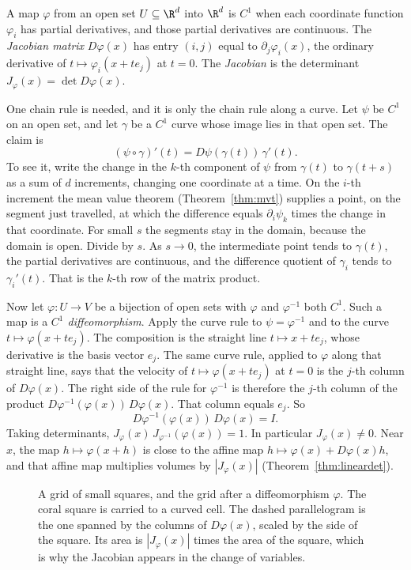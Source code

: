 A map $\varphi$ from an open set $U\subseteq\R^d$ into $\R^d$ is \emph{$C^1$} when each coordinate function $\varphi_i$ has partial derivatives, and those partial derivatives are continuous. The \emph{Jacobian matrix} $D\varphi(x)$ has entry $(i,j)$ equal to $\partial_j\varphi_i(x)$, the ordinary derivative of $t\mapsto\varphi_i(x+te_j)$ at $t=0$. The \emph{Jacobian} is the determinant $J_\varphi(x)=\det D\varphi(x)$.

One chain rule is needed, and it is only the chain rule along a curve. Let $\psi$ be $C^1$ on an open set, and let $\gamma$ be a $C^1$ curve whose image lies in that open set. The claim is
\[
(\psi\circ\gamma)'(t)=D\psi(\gamma(t))\,\gamma'(t).
\]
To see it, write the change in the $k$-th component of $\psi$ from $\gamma(t)$ to $\gamma(t+s)$ as a sum of $d$ increments, changing one coordinate at a time. On the $i$-th increment the mean value theorem (Theorem~\ref{thm:mvt}) supplies a point, on the segment just travelled, at which the difference equals $\partial_i\psi_k$ times the change in that coordinate. For small $s$ the segments stay in the domain, because the domain is open. Divide by $s$. As $s\to 0$, the intermediate point tends to $\gamma(t)$, the partial derivatives are continuous, and the difference quotient of $\gamma_i$ tends to $\gamma_i'(t)$. That is the $k$-th row of the matrix product.

Now let $\varphi:U\to V$ be a bijection of open sets with $\varphi$ and $\varphi^{-1}$ both $C^1$. Such a map is a \emph{$C^1$ diffeomorphism}. Apply the curve rule to $\psi=\varphi^{-1}$ and to the curve $t\mapsto\varphi(x+te_j)$. The composition is the straight line $t\mapsto x+te_j$, whose derivative is the basis vector $e_j$. The same curve rule, applied to $\varphi$ along that straight line, says that the velocity of $t\mapsto\varphi(x+te_j)$ at $t=0$ is the $j$-th column of $D\varphi(x)$. The right side of the rule for $\varphi^{-1}$ is therefore the $j$-th column of the product $D\varphi^{-1}(\varphi(x))\,D\varphi(x)$. That column equals $e_j$. So
\[
D\varphi^{-1}(\varphi(x))\,D\varphi(x)=I.
\]
Taking determinants, $J_\varphi(x)\,J_{\varphi^{-1}}(\varphi(x))=1$. In particular $J_\varphi(x)\ne 0$. Near $x$, the map $h\mapsto\varphi(x+h)$ is close to the affine map $h\mapsto\varphi(x)+D\varphi(x)h$, and that affine map multiplies volumes by $|J_\varphi(x)|$ (Theorem~\ref{thm:lineardet}).

\begin{figure}[ht]
\centering
{}
\caption{A grid of small squares, and the grid after a diffeomorphism $\varphi$. The coral square is carried to a curved cell. The dashed parallelogram is the one spanned by the columns of $D\varphi(x)$, scaled by the side of the square. Its area is $|J_\varphi(x)|$ times the area of the square, which is why the Jacobian appears in the change of variables.}
\label{fig:diffeo}
\end{figure}

